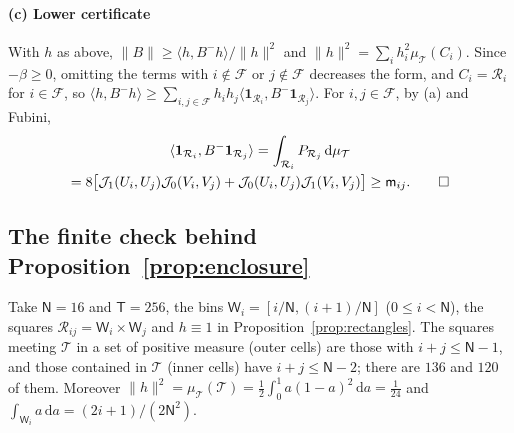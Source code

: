 \documentclass[preprint,12pt,a4paper]{elsarticle}
\theoremstyle{remark}
\newcommand{\dd}{\,\mathrm d}
\begin{document}
\paragraph{(c) Lower certificate}
With $h$ as above, $\|B\|\ge\langle h,B^-h\rangle/\|h\|^2$ and $\|h\|^2=\sum_ih_i^2\mu_{\mathcal T}(C_i)$. Since
$-\beta\ge0$, omitting the terms with $i\notin \mathcal F$ or $j\notin \mathcal F$ decreases the form, and
$C_i=\mathcal R_i$ for $i\in \mathcal F$, so
$\langle h,B^-h\rangle\ge\sum_{i,j\in \mathcal F}h_ih_j\langle\boldsymbol1_{\mathcal R_i},B^-\boldsymbol1_{\mathcal R_j}\rangle$.
For $i,j\in \mathcal F$, by (a) and Fubini,
\begin{multline*}
 \langle\boldsymbol1_{\mathcal R_i},B^-\boldsymbol1_{\mathcal R_j}\rangle=\int_{\mathcal R_i}P_{\mathcal R_j}\dd\mu_{\mathcal T}\\
 =8\bigl[\mathcal J_1(U_i,U_j)\mathcal J_0(V_i,V_j)+\mathcal J_0(U_i,U_j)\mathcal J_1(V_i,V_j)\bigr]\ge\mathsf m_{ij}. \qed
\end{multline*}

\subsection{The finite check behind Proposition~\ref{prop:enclosure}}\label{app:certificate}

Take $\mathsf N=16$ and $\mathsf T=256$, the bins $\mathsf W_i=[i/\mathsf N,(i+1)/\mathsf N]$ ($0\le i<\mathsf N$),
the squares $\mathcal R_{ij}=\mathsf W_i\times \mathsf W_j$ and $h\equiv1$ in
Proposition~\ref{prop:rectangles}. The squares meeting $\mathcal T$ in a set of positive
measure (outer cells) are those with $i+j\le\mathsf N-1$, and those contained in
$\mathcal T$ (inner cells) have $i+j\le\mathsf N-2$; there are $136$ and $120$
of them. Moreover $\|h\|^2=\mu_{\mathcal T}(\mathcal T)=\frac12\int_0^1a(1-a)^2\dd a=\frac1{24}$ and
$\int_{\mathsf W_i}a\dd a=(2i+1)/(2\mathsf N^2)$.
\end{document}
